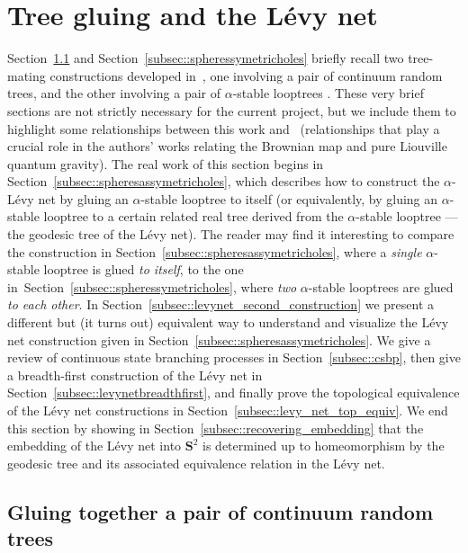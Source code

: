 \documentclass[JEP,XML,SOM,Unicode]{cedram}
\theoremstyle{plain}
\numberwithin{theorem}{section}
\theoremstyle{definition}
\renewcommand{\S}{{\mathbf S}}
\begin{document}
\section{Tree gluing and the Lévy net}
\label{sec::surfacesfromtrees}

Section~\ref{subsec::spheressymetric} and Section~\ref{subsec::spheressymetricholes} briefly recall two tree-mating constructions developed in~\cite{matingtrees}, one involving a pair of continuum random trees, and the other involving a pair of $\alpha$-stable looptrees \cite{ck2013looptrees}. These very brief sections are not strictly necessary for the current project, but we include them to highlight some relationships between this work and~\cite{matingtrees} (relationships that play a crucial role in the authors' works relating the Brownian map and pure Liouville quantum gravity). The real work of this section begins in Section~\ref{subsec::spheresassymetricholes}, which describes how to construct the $\alpha$-Lévy net by gluing an $\alpha$-stable looptree to itself (or equivalently, by gluing an $\alpha$-stable looptree to a certain related real tree derived from the $\alpha$-stable looptree --- the geodesic tree of the Lévy net). The reader may find it interesting to compare the construction in Section~\ref{subsec::spheresassymetricholes}, where a \emph{single} $\alpha$-stable looptree is glued \emph{to itself}, to the one in~Section~\ref{subsec::spheressymetricholes}, where \emph{two} $\alpha$-stable looptrees are glued \emph{to each other}. In Section~\ref{subsec::levynet_second_construction} we present a different but (it turns out) equivalent way to understand and visualize the Lévy net construction given in Section~\ref{subsec::spheresassymetricholes}. We give a review of continuous state branching processes in Section~\ref{subsec::csbp}, then give a breadth-first construction of the Lévy net in Section~\ref{subsec::levynetbreadthfirst}, and finally prove the topological equivalence of the Lévy net constructions in Section~\ref{subsec::levy_net_top_equiv}. We end this section by showing in Section~\ref{subsec::recovering_embedding} that the embedding of the Lévy net into $\S^2$ is determined up to homeomorphism by the geodesic tree and its associated equivalence relation in the Lévy net.

\subsection{Gluing together a pair of continuum random trees}
\label{subsec::spheressymetric}
\end{document}
